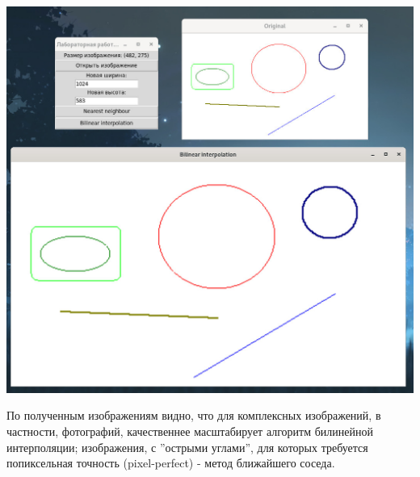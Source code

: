 \documentclass[a4paper,12pt]{article}
\begin{document}
\begin{flushleft}
  \includegraphics[scale=1.5]{bilinear_2.jpg}
\end{flushleft}

\begin{flushleft}
  По полученным изображениям видно, что для комплексных изображений, в частности, фотографий, качественнее масштабирует алгоритм билинейной интерполяции; изображения, с ''острыми углами'', для которых требуется попиксельная точность (pixel-perfect) -  метод ближайшего соседа.
\end{flushleft}
\end{document}
